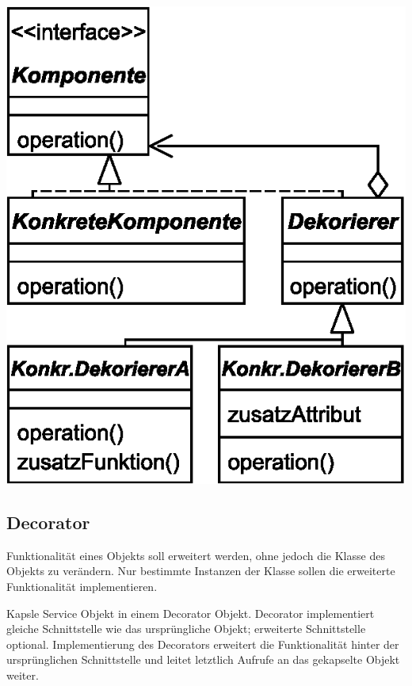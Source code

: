 \documentclass[a4paper,fontsize=9pt, DIV=calc]{scrartcl}
\begin{document}
\begin{multicols}{2}
\begin{minipage}[h]{0.63\columnwidth}
\includegraphics[width=\textwidth]{new/decorator}
\end{minipage}%
\hspace{-4.1cm}%
\begin{minipage}[h]{0.76\columnwidth}
\vspace{-5.5cm}%
\subsection{Decorator}
\begin{description}[leftmargin=*]
\item[Motivation / Problem] Funktionalität eines Objekts soll erweitert werden, ohne jedoch die Klasse des Objekts zu verändern. Nur bestimmte Instanzen der Klasse sollen die erweiterte Funktionalität implementieren.
\end{description}
\end{minipage}

\hspace{6.4cm}
\begin{minipage}[h]{0.37\columnwidth}
\vspace{-6.4cm}%
\begin{description}[leftmargin=*]
\item[Lösung] Kapsle Service Objekt in einem Decorator Objekt. Decorator implementiert gleiche Schnittstelle wie das ursprüngliche Objekt; erweiterte Schnittstelle optional. Implementierung des Decorators erweitert die Funktionalität hinter der ursprünglichen Schnittstelle und leitet letztlich Aufrufe an das gekapselte Objekt weiter.
\end{description}
\end{minipage}


\end{multicols}
\end{document}
